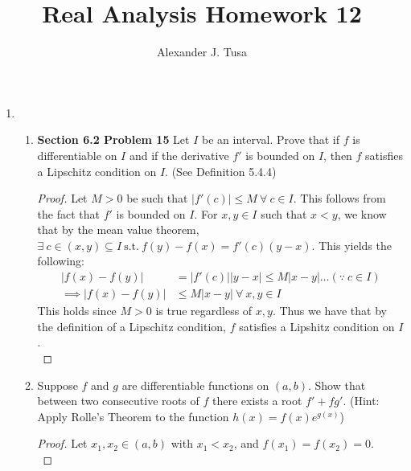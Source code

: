 \documentclass[12pt,letterpaper]{article}
\author{Alexander J. Tusa}
\title{Real Analysis Homework 12}
\newcommand{\st}{\ \text{s.t.}\ }
\theoremstyle{case}
\theoremstyle{definition}
\begin{document}
	\maketitle
	\begin{enumerate}
		\item 
		\begin{enumerate}
			\item \textbf{Section 6.2 Problem 15} Let $I$ be an interval. Prove that if $f$ is differentiable on $I$ and if the derivative $f'$ is bounded on $I$, then $f$ satisfies a Lipschitz condition on $I$. (See Definition 5.4.4)
			
			\begin{proof}
				Let $M>0$ be such that $|f'(c)| \leq M\ \forall\ c \in I$. This follows from the fact that $f'$ is bounded on $I$. For $x,y \in I$ such that $x<y$, we know that by the mean value theorem, $\exists\ c \in (x,y) \subseteq I \st f(y)-f(x)=f'(c)(y-x)$. This yields the following:
				\begin{align*}
					|f(x)-f(y)| &= |f'(c)||y-x| \leq M|x-y| \dots (\because\ c \in I) \\
					\implies |f(x)-f(y)| &\leq M|x-y|\ \forall\ x,y \in I
				\end{align*}
				This holds since $M>0$ is true regardless of $x,y$. Thus we have that by the definition of a Lipschitz condition, $f$ satisfies a Lipshitz condition on $I$.\\
			\end{proof}
			
			\item Suppose $f$ and $g$ are differentiable functions on $(a,b)$. Show that between two consecutive roots of $f$ there exists a root $f'+fg'$. (Hint: Apply Rolle's Theorem to the function $h(x)=f(x)e^{g(x)}$) \\
			
			\begin{proof}
				Let $x_1,x_2 \in (a,b)$ with $x_1<x_2$, and $f(x_1)=f(x_2)=0$.\\
				

\end{proof}
\end{enumerate}
\end{enumerate}
\end{document}
